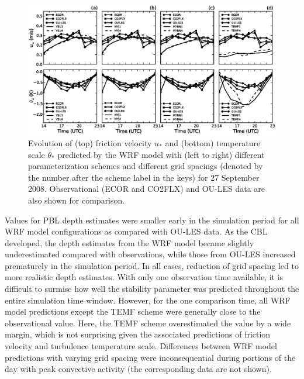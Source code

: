 \begin{figure}[ht!]
\begin{center}
\includegraphics[width=\textwidth]{figures/chapter4/ust_tst_grid_20080927}
\end{center}
\caption{Evolution of (top) friction velocity $u_*$ and (bottom) temperature scale $\theta_*$ predicted by the WRF model with (left to right) different parameterization schemes and different grid spacings (denoted by the number after the scheme label in the keys) for 27 September 2008. Observational (ECOR and CO2FLX) and OU-LES data are also shown for comparison.}
\label{figure413}
\end{figure}


Values for PBL depth estimates were smaller early in the simulation period for all WRF model configurations as compared with OU-LES data. As the CBL developed, the depth estimates from the WRF model became slightly underestimated compared with observations, while those from OU-LES increased prematurely in the simulation period. In all cases, reduction of grid spacing led to more realistic depth estimates. With only one observation time available, it is difficult to surmise how well the stability parameter was predicted throughout the entire simulation time window. However, for the one comparison time, all WRF model predictions except the TEMF scheme were generally close to the observational value. Here, the TEMF scheme overestimated the value by a wide margin, which is not surprising given the associated predictions of friction velocity and turbulence temperature scale. Differences between WRF model predictions with varying grid spacing were inconsequential during portions of the day with peak convective activity (the corresponding data are not shown). 

